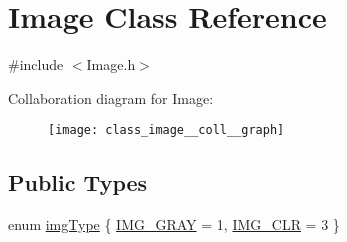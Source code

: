 \hypertarget{class_image}{\section{Image Class Reference}
\label{class_image}
}


{\ttfamily \#include $<$Image.\-h$>$}



Collaboration diagram for Image\-:\nopagebreak
\begin{figure}[H]
\begin{center}
\leavevmode
\texttt{[image: class\_image\_\_coll\_\_graph]}
\end{center}
\end{figure}
\subsection*{Public Types}
\begin{DoxyCompactItemize}
\item 
enum \hyperlink{class_image_a053e7160b6567c4929de1cae9a911581}{img\-Type} \{ \hyperlink{class_image_a053e7160b6567c4929de1cae9a911581a28e925c2b797f2443b8732f42093f632}{I\-M\-G\-\_\-\-G\-R\-A\-Y} =  1, 
\hyperlink{class_image_a053e7160b6567c4929de1cae9a911581a9a4b55aceff11e487f46b51cad901247}{I\-M\-G\-\_\-\-C\-L\-R} =  3
 \}
\end{DoxyCompactItemize}
